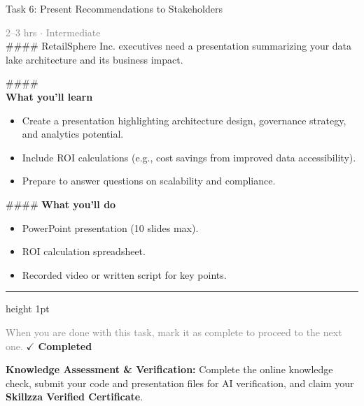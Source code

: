 \documentclass[10pt,a4paper]{article}
\begin{document}
\begin{taskbox}{Task 6: Present Recommendations to Stakeholders}

    {\small \textcolor{gray}{2--3 hrs $\cdot$ Intermediate}}\\[12pt]

    \#\#\#\#   
RetailSphere Inc. executives need a presentation summarizing your data lake architecture and its business impact.

\#\#\#\# \\[10pt]
\vspace{8pt}
{\large \textbf{\textcolor{brandLight}{What you'll learn}}}\\[4pt]  
\begin{itemize}
    \item Create a presentation highlighting architecture design, governance strategy, and analytics potential.  
    \item Include ROI calculations (e.g., cost savings from improved data accessibility).  
    \item Prepare to answer questions on scalability and compliance.  
\end{itemize}

\#\#\#\# \vspace{8pt}
{\large \textbf{\textcolor{brandLight}{What you'll do}}}\\[4pt]  
\begin{itemize}
    \item PowerPoint presentation (10 slides max).  
    \item ROI calculation spreadsheet.  
    \item Recorded video or written script for key points.\par
\end{itemize}

    \vspace{16pt}

    \textcolor{cardBorder}{\hrule height 1pt}\vspace{8pt}

    \small \textcolor{gray}{When you are done with this task, mark it as complete to proceed to the next one.} \hfill \textbf{\textcolor{brandDark}{$\checkmark$ Completed}}

\end{taskbox}

\begin{completionbox}
    \textbf{Knowledge Assessment \& Verification:} Complete the online knowledge check, submit your code and presentation files for AI verification, and claim your \textbf{Skillzza Verified Certificate}.
\end{completionbox}
\end{document}
